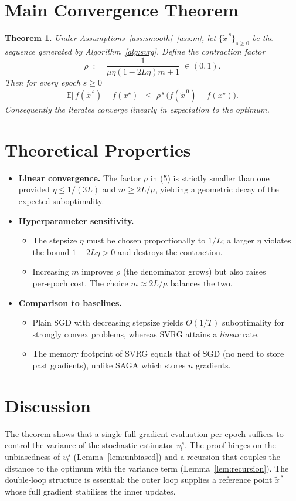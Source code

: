 \documentclass{article}
\newtheorem{theorem}{Theorem}
\newcommand{\E}{\mathbb{E}}
\begin{document}
\section*{Main Convergence Theorem}
\begin{theorem}\label{thm:linear}
Under Assumptions~\ref{ass:smooth}–\ref{ass:m}, let $\{\tilde x^{\,s}\}_{s\ge0}$ be the sequence generated by Algorithm~\ref{alg:svrg}. Define the contraction factor
\[
\rho \;:=\; \frac{1}{\mu\eta(1-2L\eta)m+1}\;\in(0,1).
\tag{5}
\]
Then for every epoch $s\ge0$
\[
\E\!\bigl[\,f(\tilde x^{\,s})-f(x^\star)\bigr]\;\le\;\rho^{\,s}\,\bigl(f(\tilde x^{\,0})-f(x^\star)\bigr).
\tag{6}
\]
Consequently the iterates converge linearly in expectation to the optimum.
\end{theorem}

\section*{Theoretical Properties}
\begin{itemize}[leftmargin=*]
\item \textbf{Linear convergence.}  The factor $\rho$ in (5) is strictly smaller than one provided $\eta\le 1/(3L)$ and $m\ge 2L/\mu$, yielding a geometric decay of the expected suboptimality.
\item \textbf{Hyperparameter sensitivity.}
    \begin{itemize}
        \item The stepsize $\eta$ must be chosen proportionally to $1/L$; a larger $\eta$ violates the bound $1-2L\eta>0$ and destroys the contraction.
        \item Increasing $m$ improves $\rho$ (the denominator grows) but also raises per‑epoch cost. The choice $m\approx 2L/\mu$ balances the two.
    \end{itemize}
\item \textbf{Comparison to baselines.}
    \begin{itemize}
        \item Plain SGD with decreasing stepsize yields $O(1/T)$ suboptimality for strongly convex problems, whereas SVRG attains a \emph{linear} rate.
        \item The memory footprint of SVRG equals that of SGD (no need to store past gradients), unlike SAGA which stores $n$ gradients.
    \end{itemize}
\end{itemize}

\section*{Discussion}
The theorem shows that a single full‑gradient evaluation per epoch suffices to control the variance of the stochastic estimator $v_t^{\,s}$. The proof hinges on the unbiasedness of $v_t^{\,s}$ (Lemma~\ref{lem:unbiased}) and a recursion that couples the distance to the optimum with the variance term (Lemma~\ref{lem:recursion}). The double‑loop structure is essential: the outer loop supplies a reference point $\tilde x^{\,s}$ whose full gradient stabilises the inner updates.
\end{document}
